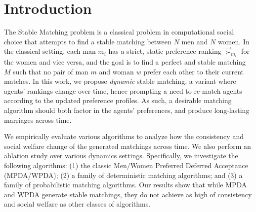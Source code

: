 \section{Introduction}
 
The Stable Matching problem is a classical problem in computational social choice that attempts to find a stable matching between $N$ men and $N$ women. In the classical setting, each man $m_i$ has a strict, static preference ranking $\overrightarrow{\succ}_{m_i}$ for the women and vice versa, and the goal is to find a perfect and stable matching $M$ such that no pair of man $m$ and woman $w$ prefer each other to their current matches. In this work, we propose \textit{dynamic} stable matching, a variant where agents' rankings change over time, hence prompting a need to re-match agents according to the updated preference profiles. As such, a desirable matching algorithm should both factor in the agents' preferences, and produce long-lasting marriages across time.


We empirically evaluate various algorithms to analyze how the consistency and social welfare change of the generated matchings across time. We also perform an ablation study over various dynamics settings. Specifically, we investigate the following algorithms: (1) the classic Men/Women Preferred Deferred Acceptance (MPDA/WPDA); (2) a family of deterministic matching algorithms; and (3) a family of probabilistic matching algorithms. Our results show that while MPDA and WPDA generate stable matchings, they do not achieve as high of consistency and social welfare as other classes of algorithms.  